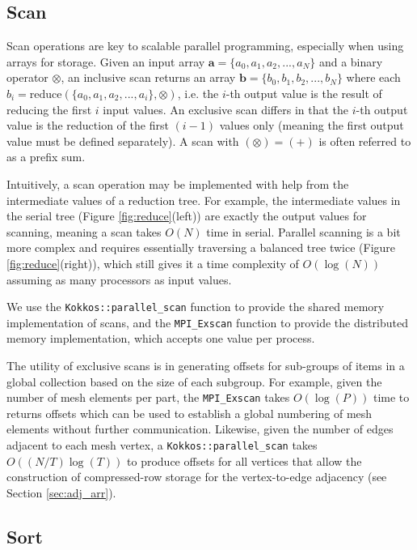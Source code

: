 \subsection{Scan}
\label{sec:scan}

Scan operations are key to scalable parallel programming, especially when using
arrays for storage.
Given an input array $\mathbf{a}=\{a_0, a_1, a_2, ..., a_N\}$ and a binary operator
$\otimes$, an inclusive scan returns an array $\mathbf{b}=\{b_0, b_1, b_2, ..., b_N\}$
where each $b_i=\text{reduce}(\{a_0, a_1, a_2, ..., a_i\}, \otimes)$, i.e. the
$i$-th output value is the result of reducing the first $i$ input values.
An exclusive scan differs in that the $i$-th output value is the reduction
of the first $(i-1)$ values only (meaning the first output value must be defined separately).
A scan with $(\otimes)=(+)$ is often referred to as a prefix sum.

Intuitively, a scan operation may be implemented with help from the intermediate
values of a reduction tree.
For example, the intermediate values in the serial tree (Figure \ref{fig:reduce}(left))
are exactly the output values for scanning, meaning a scan takes $O(N)$ time in serial.
Parallel scanning is a bit more complex and requires essentially traversing a
balanced tree twice (Figure \ref{fig:reduce}(right)), which still gives
it a time complexity of $O(\log(N))$ assuming as many processors as input values.

We use the \texttt{Kokkos::parallel\_scan} function to provide the shared
memory implementation of scans, and the \texttt{MPI\_Exscan} function
to provide the distributed memory implementation, which accepts one
value per process.

The utility of exclusive scans is in generating offsets for sub-groups of items in
a global collection based on the size of each subgroup.
For example, given the number of mesh elements per part, the \texttt{MPI\_Exscan}
takes $O(\log(P))$ time to returns offsets which can be used to establish a global
numbering of mesh elements without further communication.
Likewise, given the number of edges adjacent to each mesh vertex, a
\texttt{Kokkos::parallel\_scan} takes $O((N/T)\log(T))$ to produce offsets
for all vertices that allow the construction of compressed-row
storage for the vertex-to-edge adjacency (see Section \ref{sec:adj_arr}).

\subsection{Sort}
\label{sec:sort}


